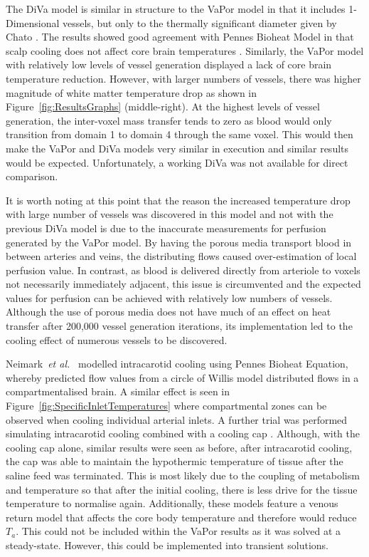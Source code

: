 \documentclass[11pt,english,a4paper,twoside,openright]{report}
\begin{document}
{{{{{{{{The DiVa model is similar in structure to the VaPor model in that it includes 1-Dimensional vessels, but only to the thermally significant diameter given by Chato \cite{kotte1999modelling}. The results showed good agreement with Pennes Bioheat Model in that scalp cooling does not affect core brain temperatures \cite{van2000numerical}. Similarly, the VaPor model with relatively low levels of vessel generation displayed a lack of core brain temperature reduction. However, with larger numbers of vessels, there was higher magnitude of white matter temperature drop as shown in Figure~\ref{fig:ResultsGraphs} (middle-right). At the highest levels of vessel generation, the inter-voxel mass transfer tends to zero as blood would only transition from domain 1 to domain 4 through the same voxel. This would then make the VaPor and DiVa models very similar in execution and similar results would be expected. Unfortunately, a working DiVa was not available for direct comparison.

It is worth noting at this point that the reason the increased temperature drop with large number of vessels was discovered in this model and not with the previous DiVa model is due to the inaccurate measurements for perfusion generated by the VaPor model. By having the porous media transport blood in between arteries and veins, the distributing flows caused over-estimation of local perfusion value. In contrast, as blood is delivered directly from arteriole to voxels not necessarily immediately adjacent, this issue is circumvented and the expected values for perfusion can be achieved with relatively low numbers of vessels. Although the use of porous media does not have much of an effect on heat transfer after 200,000 vessel generation iterations, its implementation led to the cooling effect of numerous vessels to be discovered. 

Neimark~\textit{et al.\ }\cite{neimark2007integration} modelled intracarotid cooling using Pennes Bioheat Equation, whereby predicted flow values from a circle of Willis model distributed flows in a compartmentalised brain. A similar effect is seen in Figure~\ref{fig:SpecificInletTemperatures} where compartmental zones can be observed when cooling individual arterial inlets. A further trial was performed simulating intracarotid cooling combined with a cooling cap \cite{neimark2008brain}. Although, with the cooling cap alone, similar results were seen as before, after intracarotid cooling, the cap was able to maintain the hypothermic temperature of tissue after the saline feed was terminated. This is most likely due to the coupling of metabolism and temperature so that after the initial cooling, there is less drive for the tissue temperature to normalise again. Additionally, these models feature a venous return model that affects the core body temperature and therefore would reduce $T_{a}$. This could not be included within the VaPor results as it was solved at a steady-state. However, this could be implemented into transient solutions.

}}}}}}}}
\end{document}
